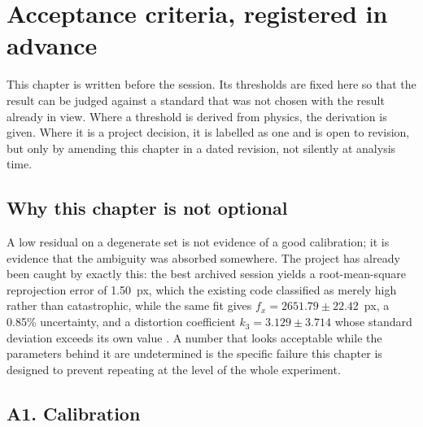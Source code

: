 \chapter{Acceptance criteria, registered in advance}
\label{chap:criteria}

This chapter is written before the session. Its thresholds are fixed here so
that the result can be judged against a standard that was not chosen with the
result already in view. Where a threshold is derived from physics, the
derivation is given. Where it is a project decision, it is labelled as one and
is open to revision, but only by amending this chapter in a dated revision,
not silently at analysis time.

\section{Why this chapter is not optional}

A low residual on a degenerate set is not evidence of a good calibration; it
is evidence that the ambiguity was absorbed somewhere. The project has already
been caught by exactly this: the best archived session yields a root-mean-square
reprojection error of 1.50~px, which the existing code classified as merely
high rather than catastrophic, while the same fit gives
$f_x = 2651.79 \pm 22.42$~px, a 0.85\% uncertainty, and a distortion
coefficient $k_3 = 3.129 \pm 3.714$ whose standard deviation exceeds its own
value \cite{linku_calibration_method}. A number that looks acceptable while
the parameters behind it are undetermined is the specific failure this chapter
is designed to prevent repeating at the level of the whole experiment.

\section{A1. Calibration}

